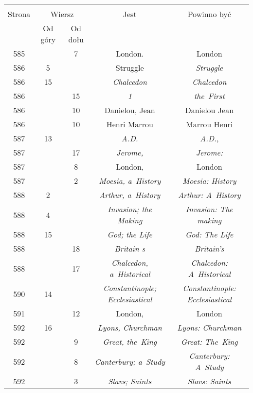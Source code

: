 \documentclass[a4paper,11pt]{article}
\begin{document}
\begin{center}
  \begin{tabular}{|c|c|c|c|c|}
    \hline
    & \multicolumn{2}{c|}{} & & \\
    Strona & \multicolumn{2}{c|}{Wiersz} & Jest
                              & Powinno być \\ \cline{2-3}
    & Od góry & Od dołu & & \\
    \hline
    585 & &  7 & London. & London \\
    586 &  5 & & Struggle & \emph{Struggle} \\
    586 & 15 & & \emph{Chalcedon} & \emph{Chalcedon} \\
    586 & & 15 & \emph{1} & \emph{the~First} \\
    586 & & 10 & Danielou, Jean & Danielou Jean \\
    586 & & 10 & Henri Marrou & Marrou Henri \\
    587 & 13 & & \emph{A.D.} & \emph{A.D.}, \\
    587 & & 17 & \emph{Jerome,} & \emph{Jerome:} \\
    587 & &  8 & London, & London \\
    587 & &  2 & \emph{Moesia, a~History} & \emph{Moesia: History} \\
    588 &  2 & & \emph{Arthur, a~History} & \emph{Arthur: A~History} \\
    588 &  4 & & \emph{Invasion; the Making}
           & \emph{Invasion: The making} \\
    588 & 15 & & \emph{God; the Life} & \emph{God: The Life} \\
    588 & & 18 & \emph{Britain s} & \emph{Britain's} \\
    588 & & 17 & \emph{Chalcedon, a~Historical}
           & \emph{Chalcedon: A~Historical} \\
    590 & 14 & & \emph{Constantinople; Ecclesiastical}
           & \emph{Constantinople: Ecclesiastical} \\
    591 & & 12 & London, & London \\
    592 & 16 & & \emph{Lyons, Churchman} & \emph{Lyons: Churchman} \\
    592 & &  9 & \emph{Great, the~King} & \emph{Great: The~King} \\
    592 & &  8 & \emph{Canterbury; a~Study} & \emph{Canterbury: A~Study} \\
    592 & &  3 & \emph{Slavs; Saints} & \emph{Slavs: Saints} \\

\end{tabular}
\end{center}
\end{document}
